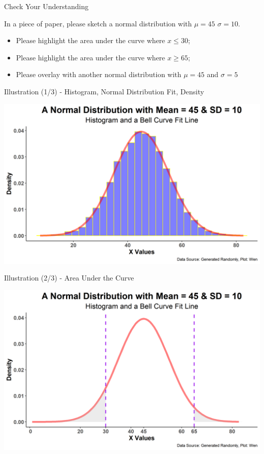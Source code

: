 \documentclass{beamer}
\begin{document}
\begin{frame}{Check Your Understanding}

In a piece of paper, please sketch a normal distribution with $\mu = 45$ $\sigma = 10$.

\begin{itemize}
\item Please highlight the area under the curve where $x \leq 30$; 
\item Please highlight the area under the curve where $x \geq 65$; 
\item Please overlay with another normal distribution with $\mu = 45$ and $\sigma = 5$ 
\end{itemize}

\end{frame}


\begin{frame}{Illustration (1/3) - Histogram, Normal Distribution Fit, Density }

\begin{center}
\includegraphics[scale=.55]{images/mean45sd10.png}

\end{center}

\end{frame}

\begin{frame}{Illustration (2/3) - Area Under the Curve}

\begin{center}
\includegraphics[scale=.55]{images/mean45sd10Area.png}

\end{center}

\end{frame}
\end{document}
